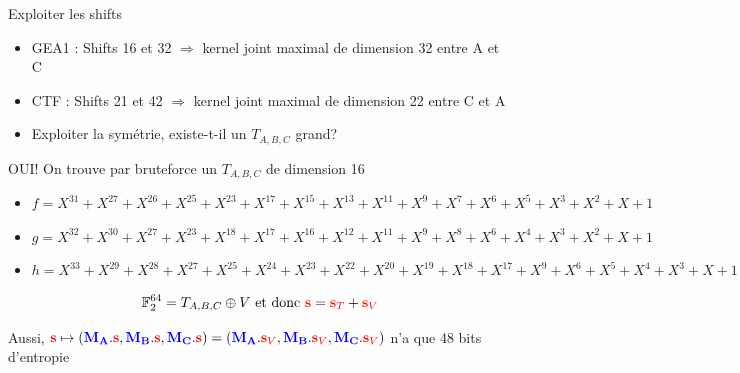 \begin{frame}{Exploiter les shifts}
\begin{itemize}
    \item GEA1 : Shifts 16 et 32 $\Rightarrow$ kernel joint maximal de dimension 32 entre A et C 
    \pause
    \item CTF : Shifts 21 et 42 $\Rightarrow$ kernel joint maximal de dimension 22 entre C et A
    \pause
    \item Exploiter la symétrie, existe-t-il un $T_{A,B,C}$ grand?
\end{itemize}

\pause

\begin{center}
OUI! On trouve par bruteforce un $T_{A,B,C}$ de dimension 16
\end{center}

\pause

\begin{small}
\begin{itemize}
    \item $f = X^{31} + X^{27} + X^{26} + X^{25} + X^{23} + X^{17} + X^{15} + X^{13} + X^{11} + X^9 + X^7 + X^6 + X^5 + X^3 + X^2 + X + 1$
    \item $g = X^{32} + X^{30} + X^{27} + X^{23} + X^{18} + X^{17} + X^{16} + X^{12} + X^{11} + X^9 + X^8 + X^6 + X^4 + X^3 + X^2 + X + 1$
    \item $h = X^{33} + X^{29} + X^{28} + X^{27} + X^{25} + X^{24} + X^{23} + X^{22} + X^{20} + X^{19} + X^{18} + X^{17} + X^9 + X^6 + X^5 + X^4 + X^3 + X + 1$
\end{itemize}
\end{small}

\pause
\[\mathbb{F}_2^{64} = T_{A,B,C}\oplus  V \text{ et donc } \textcolor{red}{\mathbf{s}} = \textcolor{red}{\mathbf{s}_{T}}+\textcolor{red}{\mathbf{s}_V}\]

Aussi, $\textcolor{red}{\mathbf{s}}\mapsto (\textcolor{blue}{\mathbf{M_A}}.\textcolor{red}{\mathbf{s}},\textcolor{blue}{\mathbf{M_B}}.\textcolor{red}{\mathbf{s}},\textcolor{blue}{\mathbf{M_C}}.\textcolor{red}{\mathbf{s}}) =(\textcolor{blue}{\mathbf{M_A}}.\textcolor{red}{\mathbf{s}_V},\textcolor{blue}{\mathbf{M_B}}.\textcolor{red}{\mathbf{s}_V},\textcolor{blue}{\mathbf{M_C}}.\textcolor{red}{\mathbf{s}_V})$ n'a que 48 bits d'entropie
    
\end{frame}

